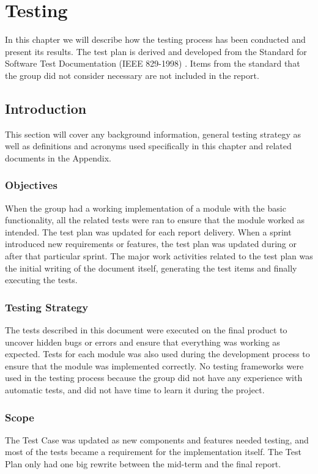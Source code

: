 \section{Testing}
In this chapter we will describe how the testing process has been conducted and present its results. The test plan is derived and developed from the Standard for Software Test Documentation (IEEE 829-1998) \cite{iee829}. Items from the standard that the group did not consider necessary are not included in the report.

\subsection{Introduction}
This section will cover any background information, general testing strategy as well as definitions and acronyms used specifically in this chapter and related documents in the Appendix.

\subsubsection{Objectives}
When the group had a working implementation of a module with the basic functionality, all the related tests were ran to ensure that the module worked as intended. The test plan was updated for each report delivery. When a sprint introduced new requirements or features, the test plan was updated during or after that particular sprint. The major work activities related to the test plan was the initial writing of the document itself, generating the test items and finally executing the tests.

\subsubsection{Testing Strategy}
The tests described in this document were executed on the final product to uncover hidden bugs or errors and ensure that everything was working as expected. Tests for each module was also used during the development process to ensure that the module was implemented correctly. No testing frameworks were used in the testing process because the group did not have any experience with automatic tests, and did not have time to learn it during the project.

\subsubsection{Scope}
The Test Case was updated as new components and features needed testing, and most of the tests became a requirement for the implementation itself. The Test Plan only had one big rewrite between the mid-term and the final report.


